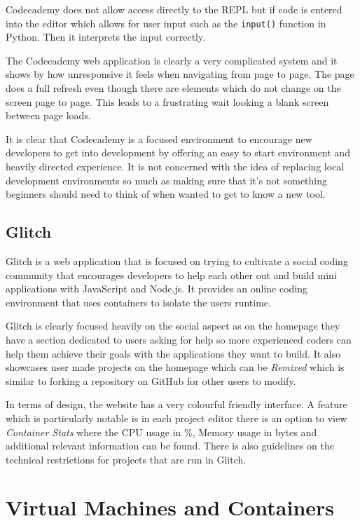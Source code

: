 Codecademy does not allow access directly to the REPL but if code is entered into the editor which allows for user input such as the \texttt{input()} function in Python. Then it interprets the input correctly.

The Codecademy web application is clearly a very complicated system and it shows by how unresponsive it feels when navigating from page to page. The page does a full refresh even though there are elements which do not change on the screen page to page. This leads to a frustrating wait looking a blank screen between page loads.

It is clear that Codecademy is a focused environment to encourage new developers to get into development by offering an easy to start environment and heavily directed experience. It is not concerned with the idea of replacing local development environments so much as making sure that it's not something beginners should need to think of when wanted to get to know a new tool.

\subsection{Glitch}
Glitch is a web application that is focused on trying to cultivate a social coding community that encourages developers to help each other out and build mini applications with JavaScript and Node.js. It provides an online coding environment that uses containers to isolate the users runtime.

Glitch is clearly focused heavily on the social aspect as on the homepage they have a section dedicated to users asking for help so more experienced coders can help them achieve their goals with the applications they want to build. It also showcases user made projects on the homepage which can be \textit{Remixed} which is similar to forking a repository on GitHub for other users to modify.

In terms of design, the website has a very colourful friendly interface. A feature which is particularly notable is in each project editor there is an option to view \textit{Container Stats} where the CPU usage in \%, Memory usage in bytes and additional relevant information can be found. There is also guidelines on the technical restrictions for projects that are run in Glitch. 


\section{Virtual Machines and Containers} \label{lit-containers}

